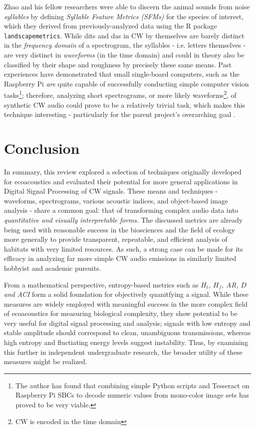 \documentclass[letterpaper, 12 pt, conference]{ieeeconf}
\begin{document}
    Zhao and his fellow researchers were able to discern the animal sounds from noise \textit{syllables} by defining \textit{Syllable Feature Metrics (SFMs)} for the species of interest, which they derived from previously-analyzed data using the R package \texttt{landscapemetrics}. While dits and das in CW by themselves are barely distinct in the \textit{frequency domain} of a spectrogram, the syllables - i.e. letters themselves - are very distinct in \textit{waveforms} (in the time domain) and could in theory also be classified by their shape and roughness by precisely these same means. Past experiences have demonstrated that small single-board computers, such as the Raspberry Pi \textit{are} quite capable of successfully conducting simple computer vision tasks\footnote{The author has found that combining simple Python scripts and Tesseract on Raspberry Pi SBCs to decode numeric values from mono-color image sets has proved to be very viable.}; therefore, analyzing short spectrograms, or more likely waveforms\footnote{CW is encoded in the time domain}, of synthetic CW audio could prove to be a relatively trivial task, which makes this technique interesting - particularly for the parent project's overarching goal \autocite{audioCW}.

\section{Conclusion}

    In summary, this review explored a selection of techniques originally developed for ecoacoustics and evaluated their potential for more general applications in Digital Signal Processing of CW signals. These means and techniques - waveforms, spectrograms, various acoustic indices, and object-based image analysis - share a common goal: that of transforming complex audio data into \textit{quantitative and visually interpretable forms.} The discussed metrics are already being used with reasonable success in the biosciences and the field of ecology more generally to provide transparent, repeatable, and efficient analysis of habitats with very limited resources. As such, a strong case can be made for its efficacy in analyzing far more simple CW audio emissions in similarly limited hobbyist and academic pursuits. 

    From a mathematical perspective, entropy-based metrics such as \textit{$H_t$, $H_f$, AR, $D$ and ACI} form a solid foundation for objectively quanitfying a signal. While these measures are widely employed with meaningful success in the more complex field of ecoacoustics for measuring biological complexity, they show potential to be very useful for digital signal processing and analysis; signals with low entropy and stable amplitude should correspond to clean, unambiguous transmissions, whereas high entropy and fluctiating energy levels suggest instability. Thus, by examining this further in independent undergraduate research, the broader utility of these measures might be realized.
\end{document}
